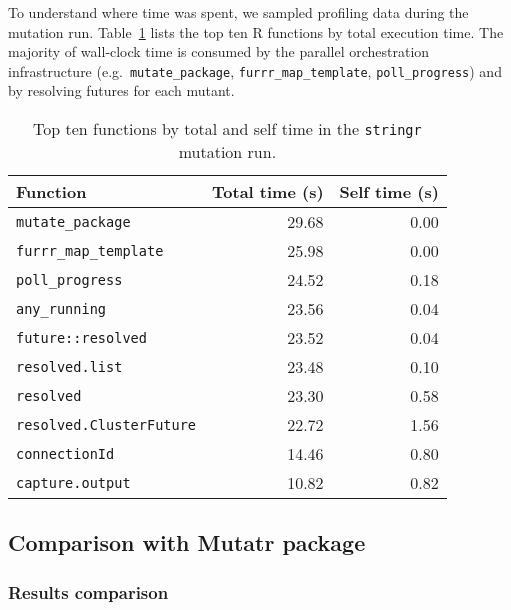 To understand where time was spent, we sampled profiling data during the mutation run.  Table~\ref{tab:stringr-profile} lists the top ten R functions by total execution time.  The majority of wall‐clock time is consumed by the parallel orchestration infrastructure (e.g.\ \texttt{mutate\_package}, \texttt{furrr\_map\_template}, \texttt{poll\_progress}) and by resolving futures for each mutant.

\begin{table}[htbp]
  \centering
  \begin{tabular}{lrr}
    \hline\hline
    Function                   & Total time (s) & Self time (s) \\
    \hline
    \texttt{mutate\_package}           & 29.68          & 0.00           \\
    \texttt{furrr\_map\_template}      & 25.98          & 0.00           \\
    \texttt{poll\_progress}            & 24.52          & 0.18           \\
    \texttt{any\_running}              & 23.56          & 0.04           \\
    \texttt{future::resolved}          & 23.52          & 0.04           \\
    \texttt{resolved.list}             & 23.48          & 0.10           \\
    \texttt{resolved}                  & 23.30          & 0.58           \\
    \texttt{resolved.ClusterFuture}    & 22.72          & 1.56           \\
    \texttt{connectionId}              & 14.46          & 0.80           \\
    \texttt{capture.output}            & 10.82          & 0.82           \\
    \hline
  \end{tabular}
  \caption{Top ten functions by total and self time in the \texttt{stringr} mutation run.}
  \label{tab:stringr-profile}
\end{table}

\subsection{Comparison with Mutatr package}

 
\subsubsection{Results comparison}

